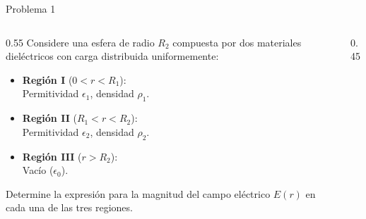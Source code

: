 \documentclass[10pt,aspectratio=169]{beamer}
\begin{document}
\begin{frame}{Problema 1}
    \begin{columns}[c]

        \begin{column}{0.55\textwidth}
            Considere una esfera de radio $R_2$ compuesta por dos materiales dieléctricos con carga distribuida uniformemente:

            \begin{itemize}
                \item \textbf{Región I} ($0 < r < R_1$): \\ Permitividad $\epsilon_1$, densidad $\rho_1$.
                \item \textbf{Región II} ($R_1 < r < R_2$): \\ Permitividad $\epsilon_2$, densidad $\rho_2$.
                \item \textbf{Región III} ($r > R_2$): \\ Vacío ($\epsilon_0$).
            \end{itemize}

            Determine la expresión para la magnitud del campo eléctrico $E(r)$ en cada una de las tres regiones.
        \end{column}

        \begin{column}{0.45\textwidth}
            \centering
            \begin{minipage}{0.6\textwidth}
                \centering
            \end{minipage}
        \end{column}

    \end{columns}
\end{frame}
\end{document}
